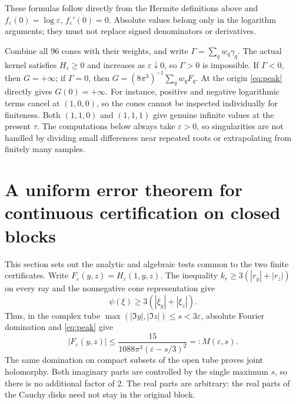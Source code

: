 \documentclass[11pt,a4paper]{article}
\theoremstyle{definition}\newtheorem{definition}[theorem]{Definition}
\theoremstyle{remark}\newtheorem{remark}[theorem]{Remark}
\newcommand{\abs}[1]{\left|#1\right|}
\begin{document}
These formulas follow directly from the Hermite definitions above and $f_\varepsilon(0)=\log\varepsilon$, $f_\varepsilon'(0)=0$. Absolute values belong only in the logarithm arguments; they must not replace signed denominators or derivatives.

Combine all 96 cones with their weights, and write $\Gamma=\sum_qw_q\gamma_q$. The actual kernel satisfies $H_\varepsilon\ge0$ and increases as $\varepsilon\downarrow0$, so $\Gamma>0$ is impossible. If $\Gamma<0$, then $G=+\infty$; if $\Gamma=0$, then $G=(8\pi^3)^{-1}\sum_qw_qF_q$. At the origin \eqref{eq:peak} directly gives $G(0)=+\infty$. For instance, positive and negative logarithmic terms cancel at $(1,0,0)$, so the cones cannot be inspected individually for finiteness. Both $(1,1,0)$ and $(1,1,1)$ give genuine infinite values at the present $\tau$. The computations below always take $\varepsilon>0$, so singularities are not handled by dividing small differences near repeated roots or extrapolating from finitely many samples.

\section{A uniform error theorem for continuous certification on closed blocks}
This section sets out the analytic and algebraic tests common to the two finite certificates. Write $F_\varepsilon(y,z)=H_\varepsilon(1,y,z)$. The inequality
$k_r\ge3(\abs{r_y}+\abs{r_z})$ on every ray and the nonnegative cone representation give
\begin{equation}\label{eq:strip-symbol}
 \psi(\xi)\ge3(\abs{\xi_y}+\abs{\xi_z}).
\end{equation}
Thus, in the complex tube $\max(\abs{\Im y},\abs{\Im z})\le s<3\varepsilon$, absolute Fourier domination and \eqref{eq:peak} give
\begin{equation}\label{eq:tube}
 \abs{F_\varepsilon(y,z)}\le
 \frac{15}{1088\pi^3(\varepsilon-s/3)^2}=:M(\varepsilon,s).
\end{equation}
The same domination on compact subsets of the open tube proves joint holomorphy. Both imaginary parts are controlled by the single maximum $s$, so there is no additional factor of $2$. The real parts are arbitrary: the real parts of the Cauchy disks need not stay in the original block.
\end{document}
